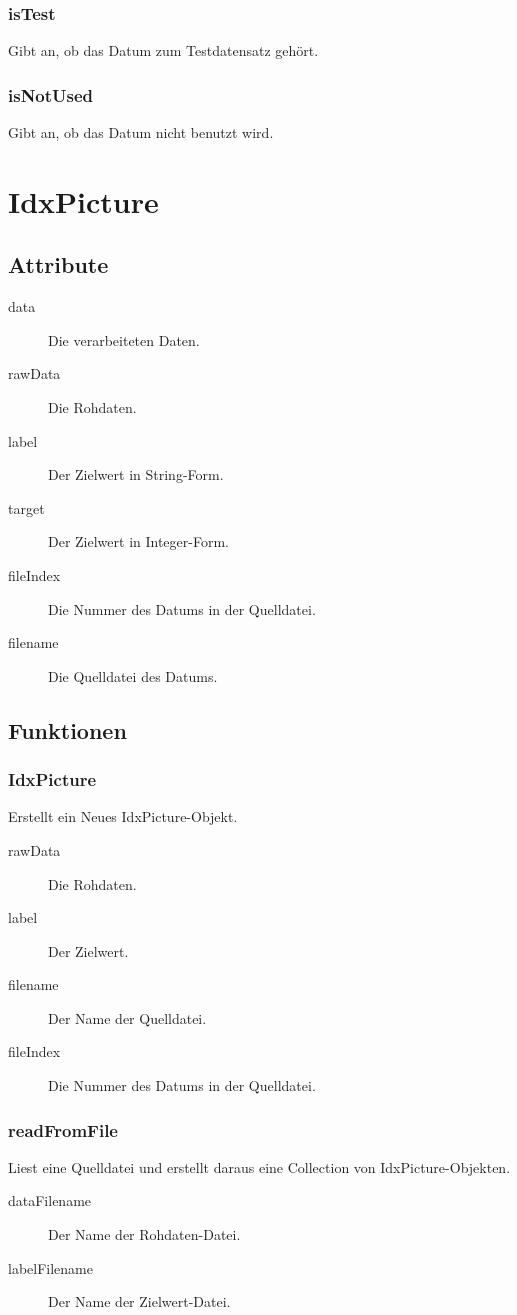 \documentclass[a4paper,10pt]{scrartcl}
\begin{document}
\subsubsection{isTest}
Gibt an, ob das Datum zum Testdatensatz gehört.

\subsubsection{isNotUsed}
Gibt an, ob das Datum nicht benutzt wird.

\section{IdxPicture}

\subsection{Attribute}

\begin{description}
\item[data] Die verarbeiteten Daten.
\item[rawData] Die Rohdaten.
\item[label] Der Zielwert in String-Form.
\item[target] Der Zielwert in Integer-Form.
\item[fileIndex] Die Nummer des Datums in der Quelldatei.
\item[filename] Die Quelldatei des Datums.
\end{description}

\subsection{Funktionen}

\subsubsection{IdxPicture}
Erstellt ein Neues IdxPicture-Objekt.
\begin{description}
\item[rawData] Die Rohdaten.
\item[label] Der Zielwert.
\item[filename] Der Name der Quelldatei.
\item[fileIndex] Die Nummer des Datums in der Quelldatei.
\end{description}

\subsubsection{readFromFile}
Liest eine Quelldatei und erstellt daraus eine Collection von IdxPicture-Objekten.
\begin{description}
\item[dataFilename] Der Name der Rohdaten-Datei.
\item[labelFilename] Der Name der Zielwert-Datei.
\end{description}
\end{document}
